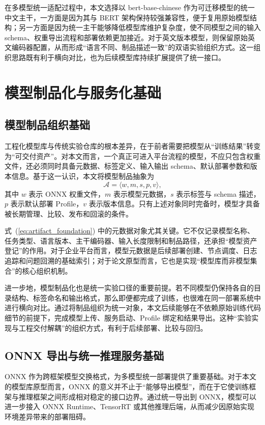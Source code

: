 在多模型统一适配过程中，本文选择以 bert-base-chinese 作为可迁移模型的统一中文主干，一方面是因为其与 BERT 架构保持较强兼容性，便于复用原始模型结构；另一方面是因为统一主干能够降低模型库维护复杂度，使不同模型之间的输入 schema、权重导出流程和部署依赖更加接近。对于英文版本模型，则保留原始英文编码器配置，从而形成“语言不同、制品描述一致”的双语实验组织方式。这一组织思路既有利于横向对比，也为后续模型库持续扩展提供了统一接口。

\section{模型制品化与服务化基础}
\subsection{模型制品组织基础}
工程化模型库与传统实验仓库的根本差异，在于前者需要把模型从“训练结果”转变为“可交付资产”。对本文而言，一个真正可进入平台流程的模型，不应只包含权重文件，还必须同时具备元数据、标签定义、输入输出 schema、默认部署参数和版本信息。基于这一认识，本文将模型制品抽象为
\begin{equation}
\mathcal{A}=\langle w,m,s,p,v \rangle,
\label{eq:artifact_foundation}
\end{equation}
其中 $w$ 表示 ONNX 权重文件，$m$ 表示模型元数据，$s$ 表示标签与 schema 描述，$p$ 表示默认部署 Profile，$v$ 表示版本信息。只有上述对象同时完备时，模型才具备被长期管理、比较、发布和回滚的条件。

式~(\ref{eq:artifact_foundation}) 中的元数据对象尤其关键。它不仅记录模型名称、任务类型、语言版本、主干编码器、输入长度限制和制品路径，还承担“模型资产登记”的作用。对于企业平台而言，模型元数据是后续部署创建、节点调度、日志追踪和问题回溯的基础索引；对于论文原型而言，它也是实现“模型库而非模型集合”的核心组织机制。

进一步地，模型制品化也是统一实验口径的重要前提。若不同模型仍保持各自的目录结构、标签命名和输出格式，那么即便都完成了训练，也很难在同一部署系统中进行横向对比。通过将制品组织为统一对象，本文后续能够在不依赖原始训练代码细节的前提下，完成模型上传、服务启动、Profile 绑定和结果导出。这种“实验实现与工程交付解耦”的组织方式，有利于后续部署、比较与回归。

\subsection{ONNX 导出与统一推理服务基础}
ONNX 作为跨框架模型交换格式，为多模型统一部署提供了重要基础。对于本文的模型库原型而言，ONNX 的意义并不止于“能够导出模型”，而在于它使训练框架与推理框架之间形成相对稳定的接口边界。通过统一导出到 ONNX，模型可以进一步接入 ONNX Runtime、TensorRT 或其他推理后端，从而减少因原始实现环境差异带来的部署阻碍。

